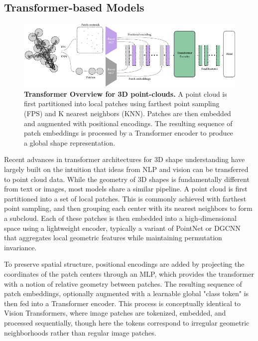 \subsection{Transformer-based Models}
\label{ssec:transformer_based_models}

\begin{figure}[h]
  \centering
  \includegraphics[width=1.0\linewidth]{figs/transformer_overview.pdf}
   \caption{\textbf{Transformer Overview for 3D point-clouds.} A point cloud is first partitioned into local patches using farthest point sampling (FPS) and K nearest neighbors (KNN). Patches are then embedded and augmented with positional encodings. The resulting sequence of patch embeddings is processed by a Transformer encoder to produce a global shape representation.}
   \label{fig:transformer-overview}
\end{figure}

Recent advances in transformer architectures for 3D shape understanding have largely built on the intuition that ideas from NLP and vision can be transferred to point cloud data. While the geometry of 3D shapes is fundamentally different from text or images, most models share a similar pipeline. A point cloud is first partitioned into a set of local patches. This is commonly achieved with farthest point sampling, and then grouping each center with its nearest neighbors to form a subcloud. Each of these patches is then embedded into a high-dimensional space using a lightweight encoder, typically a variant of PointNet or DGCNN that aggregates local geometric features while maintaining permutation invariance.

To preserve spatial structure, positional encodings are added by projecting the coordinates of the patch centers through an MLP, which provides the transformer with a notion of relative geometry between patches. The resulting sequence of patch embeddings, optionally augmented with a learnable global "class token" is then fed into a Transformer encoder. This process is conceptually identical to Vision Transformers, where image patches are tokenized, embedded, and processed sequentially, though here the tokens correspond to irregular geometric neighborhoods rather than regular image patches.


